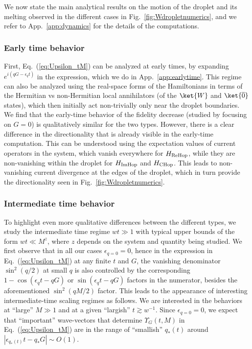 \documentclass[prx,letterpaper,aps,superscriptaddress,floatfix,twocolumn,nofootinbib]{revtex4-2}
\theoremstyle{definition}
\newcommand{\ktO}{\ket{\overline{0}}}
\newcommand{\ktW}{\ket{W}}
\begin{document}
%
We now state the main analytical results on the motion of the droplet and its melting observed in the different cases in Fig.~\ref{fig:Wdropletnumerics}, and we refer to App.~\ref{app:dynamics} for the details of the computations.
%
%
%
\subsubsection{Early time behavior}
%
%
First, Eq.~(\ref{eq:Upsilon_tM}) can be analyzed at early times, by expanding $e^{i(q G - \epsilon_q t)}$ in the expression, which we do in App.~\ref{app:earlytime}.
%
This regime can also be analyzed using the real-space forms of the Hamiltonians in terms of the Hermitian vs non-Hermitian local annihilators (of the $\ktW$ and $\ktO$ states), which then initially act non-trivially only near the droplet boundaries.
%
We find that the early-time behavior of the fidelity decrease (studied by focusing on $G = 0$) is qualitatively similar for the two types.
%
However, there is a clear difference in the directionality that is already visible in the early-time computation.
%
This can be understood using the expectation values of current operators in the system, which vanish everywhere for $H_{\rm ReHop}$, while they are non-vanishing within the droplet for $H_{\rm ImHop}$ and $H_{\rm CHop}$. 
%
This leads to non-vanishing current divergence at the edges of the droplet, which in turn provide the directionality seen in Fig.~\ref{fig:Wdropletnumerics}.
%
%

%
\subsubsection{Intermediate time behavior}
\label{subsubsec:intermediate_time}
%
To highlight even more qualitative differences between the different types, we study the intermediate time regime $wt \gg 1$ with typical upper bounds of the form $wt \ll M^z$, where $z$ depends on the system and quantity being studied.
%
We first observe that in all our cases $\epsilon_{q=0} = 0$, hence in the expression in Eq.~(\ref{eq:Upsilon_tM}) at any finite $t$ and $G$, the vanishing denominator $\sin^2(q/2)$ at small $q$ is also controlled by the corresponding $1 - \cos(\epsilon_q t - q G)$ or $\sin(\epsilon_q t - q G)$ factors in the numerator, besides the aforementioned $\sin^2(qM/2)$ factor.
%
This leads to the appearance of  interesting intermediate-time scaling regimes as follows.
%
We are interested in the behaviors at ``large'' $M \gg 1$ and at a given ``largish'' $t \gtrsim w^{-1}$.
%
Since $\epsilon_{q=0} = 0$, we expect that ``important'' wave-vectors that determine $\Upsilon_G(t,M)$ in Eq.~(\ref{eq:Upsilon_tM}) are in the range of ``smallish'' $q_*(t)$ around $|\epsilon_{q_*(t)} t - q_* G| \sim O(1)$.
%
\end{document}
